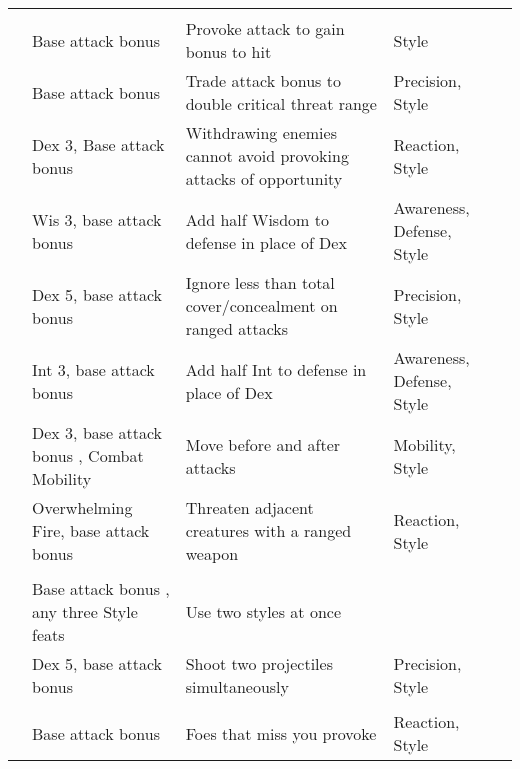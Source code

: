 {\begin{longtabu}{>{\lcol}p{10em} >{\lcol}p{15em} >{\lcol}X >{\lcol}p{6em} >{\lcol}p{3em}}
        \midrule
         &  &  &  &  \\
         & Base attack bonus  & Provoke attack to gain bonus to hit & Style &  \\
         & Base attack bonus  & Trade attack bonus to double critical threat range & Precision, Style &  \\
         & Dex 3, Base attack bonus  & Withdrawing enemies cannot avoid provoking attacks of opportunity & Reaction, Style &  \\
         & Wis 3, base attack bonus  & Add half Wisdom to defense in place of Dex & Awareness, Defense, Style &  \\
         & Dex 5, base attack bonus  & Ignore less than total cover/concealment on ranged attacks & Precision, Style &  \\
         & Int 3, base attack bonus  & Add half Int to defense in place of Dex & Awareness, Defense, Style &  \\
         & Dex 3, base attack bonus , Combat Mobility & Move before and after attacks & Mobility, Style &  \\
         & Overwhelming Fire, base attack bonus  & Threaten adjacent creatures with a ranged weapon & Reaction, Style &  \\

        \midrule
         &  &  &  &  \\
         & Base attack bonus , any three Style feats & Use two styles at once & \x &  \\
         & Dex 5, base attack bonus  & Shoot two projectiles simultaneously & Precision, Style &  \\

        \midrule
         &  &  &  &  \\
         & Base attack bonus  & Foes that miss you provoke & Reaction, Style&  \\
    \end{longtabu}
}%

